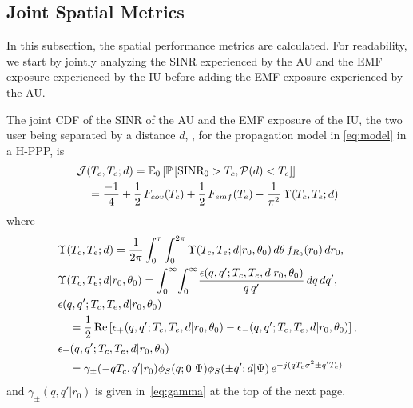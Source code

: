 \subsection{Joint Spatial Metrics}
In this subsection, the spatial performance metrics are calculated. For readability, we start by jointly analyzing the SINR experienced by the AU and the EMF exposure experienced by the IU before adding the EMF exposure experienced by the AU.
\begin{theorem}\label{th:joint1}
The joint CDF of the SINR of the AU and the EMF exposure of the IU, the two user being separated by a distance $d$, , for the propagation model in \eqref{eq:model} in a H-PPP, is
\begin{align}\begin{split}
    &\mathcal{J}(T_{c}, T_{e};d) = \mathbb E_0\left[\mathbb{P}\left[\textrm{\normalfont SINR}_0 > T_{c}, \mathcal{P}(d) < T_{e}\right]\right]\\
    &\quad= \frac{-1}{4} + \frac{1}{2}\, F_{cov}(T_{c}) + \frac{1}{2}\, F_{emf}(T_{e}) - \frac{1}{\pi^2}\, \Upsilon(T_{c}, T_{e}; d)
\end{split}\end{align}
where
{\smalltonormalsize
\begin{align}\begin{split}
    &\Upsilon(T_{c}, T_{e}; d) = \frac{1}{2\pi}\int_0^{\tau}\int_0^{2\pi}\Upsilon(T_{c}, T_{e}; d| r_0, \theta_0)\,d\theta \,f_{R_0}(r_0)\,dr_0,\\
    &\Upsilon(T_{c}, T_{e}; d| r_0, \theta_0) = \int_0^{\infty} \!\int_0^{\infty} \!\frac{\epsilon(q, q';T_{c},T_{e},d|r_0, \theta_0)}{q\, q'}\,dq\, dq',\\
    &\epsilon(q, q';T_{c},T_{e},d|r_0, \theta_0) \\
    &\quad = \frac{1}{2}\,\textrm{\normalfont Re}\left[\epsilon_+(q, q';T_{c},T_{e},d|r_0, \theta_0)-\epsilon_-(q, q';T_{c},T_{e},d|r_0, \theta_0)\right],\\
    &\epsilon_\pm(q, q';T_{c},T_{e},d|r_0, \theta_0) \\
    &\quad= \gamma_\pm(-q T_{c}, q'|r_0)\phi_{S}(q; 0 |\Psi)\phi_{S}(\pm q'; d|\Psi)\, e^{-j (q T_{c}\sigma^2 \pm q' T_{e})}
\end{split}\end{align}}
and $\gamma_\pm(q, q'|r_0)$ is given in~\eqref{eq:gamma} at the top of the next page.
    \begin{figure*}[!h]
{\scriptsize
\begin{multline}\label{eq:gamma}

\end{multline}}
\end{figure*}
\end{theorem}
